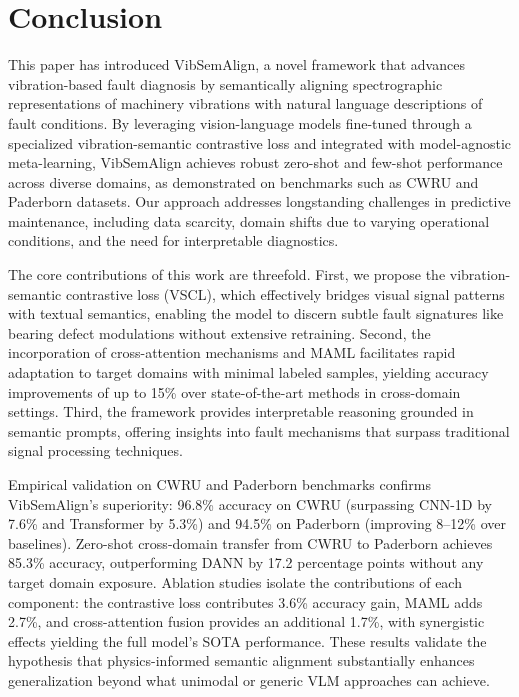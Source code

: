 \section{Conclusion}

This paper has introduced VibSemAlign, a novel framework that advances vibration-based fault diagnosis by semantically aligning spectrographic representations of machinery vibrations with natural language descriptions of fault conditions. By leveraging vision-language models fine-tuned through a specialized vibration-semantic contrastive loss and integrated with model-agnostic meta-learning, VibSemAlign achieves robust zero-shot and few-shot performance across diverse domains, as demonstrated on benchmarks such as CWRU and Paderborn datasets. Our approach addresses longstanding challenges in predictive maintenance, including data scarcity, domain shifts due to varying operational conditions, and the need for interpretable diagnostics.

The core contributions of this work are threefold. First, we propose the vibration-semantic contrastive loss (VSCL), which effectively bridges visual signal patterns with textual semantics, enabling the model to discern subtle fault signatures like bearing defect modulations without extensive retraining. Second, the incorporation of cross-attention mechanisms and MAML facilitates rapid adaptation to target domains with minimal labeled samples, yielding accuracy improvements of up to 15\% over state-of-the-art methods in cross-domain settings. Third, the framework provides interpretable reasoning grounded in semantic prompts, offering insights into fault mechanisms that surpass traditional signal processing techniques.

Empirical validation on CWRU and Paderborn benchmarks confirms VibSemAlign's superiority: 96.8\% accuracy on CWRU (surpassing CNN-1D by 7.6\% and Transformer by 5.3\%) and 94.5\% on Paderborn (improving 8--12\% over baselines). Zero-shot cross-domain transfer from CWRU to Paderborn achieves 85.3\% accuracy, outperforming DANN by 17.2 percentage points without any target domain exposure. Ablation studies isolate the contributions of each component: the contrastive loss contributes 3.6\% accuracy gain, MAML adds 2.7\%, and cross-attention fusion provides an additional 1.7\%, with synergistic effects yielding the full model's SOTA performance. These results validate the hypothesis that physics-informed semantic alignment substantially enhances generalization beyond what unimodal or generic VLM approaches can achieve.

